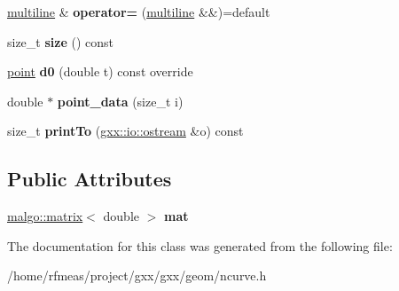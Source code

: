 \begin{DoxyCompactItemize}
\item 
\hyperlink{classgxx_1_1ngeom_1_1multiline}{multiline} \& {\bfseries operator=} (\hyperlink{classgxx_1_1ngeom_1_1multiline}{multiline} \&\&)=default\hypertarget{classgxx_1_1ngeom_1_1multiline_afcfa1ef1d3260c6fe4bde5cd36455de9}{}\label{classgxx_1_1ngeom_1_1multiline_afcfa1ef1d3260c6fe4bde5cd36455de9}

\item 
size\+\_\+t {\bfseries size} () const \hypertarget{classgxx_1_1ngeom_1_1multiline_a7845ffd1f7c904f67e6f04c49cb98d6a}{}\label{classgxx_1_1ngeom_1_1multiline_a7845ffd1f7c904f67e6f04c49cb98d6a}

\item 
\hyperlink{classgxx_1_1ngeom_1_1point}{point} {\bfseries d0} (double t) const override\hypertarget{classgxx_1_1ngeom_1_1multiline_ae8dce31d18a921f03eb185485af0b2c4}{}\label{classgxx_1_1ngeom_1_1multiline_ae8dce31d18a921f03eb185485af0b2c4}

\item 
double $\ast$ {\bfseries point\+\_\+data} (size\+\_\+t i)\hypertarget{classgxx_1_1ngeom_1_1multiline_a036af04faf7d4b778d8bb44a73036aad}{}\label{classgxx_1_1ngeom_1_1multiline_a036af04faf7d4b778d8bb44a73036aad}

\item 
size\+\_\+t {\bfseries print\+To} (\hyperlink{classgxx_1_1io_1_1ostream}{gxx\+::io\+::ostream} \&o) const \hypertarget{classgxx_1_1ngeom_1_1multiline_a6a1f45ca7d25629873df99c7987444b3}{}\label{classgxx_1_1ngeom_1_1multiline_a6a1f45ca7d25629873df99c7987444b3}

\end{DoxyCompactItemize}
\subsection*{Public Attributes}
\begin{DoxyCompactItemize}
\item 
\hyperlink{classmalgo_1_1matrix}{malgo\+::matrix}$<$ double $>$ {\bfseries mat}\hypertarget{classgxx_1_1ngeom_1_1multiline_aebf4155d8ae67f10c5a72e368e815e47}{}\label{classgxx_1_1ngeom_1_1multiline_aebf4155d8ae67f10c5a72e368e815e47}

\end{DoxyCompactItemize}


The documentation for this class was generated from the following file\+:\begin{DoxyCompactItemize}
\item 
/home/rfmeas/project/gxx/gxx/geom/ncurve.\+h\end{DoxyCompactItemize}
